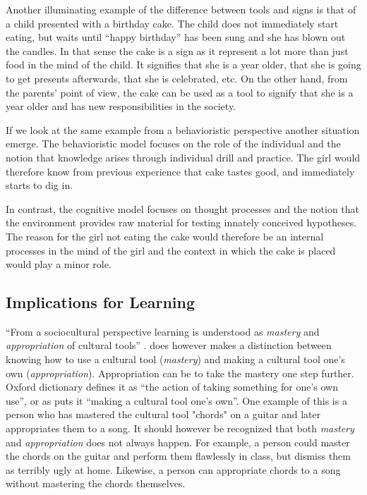 Another illuminating example of the difference between tools and signs is that of a child presented with a birthday cake. The child does not immediately start eating, but waits until “happy birthday” has been sung and she has blown out the candles. In that sense the cake is a sign as it represent a lot more than just food in the mind of the child. It signifies that she is a year older, that she is going to get presents afterwards, that she is celebrated, etc. On the other hand, from the parents’ point of view, the cake can be used as a tool to signify that she is a year older and has new responsibilities in the society. 

If we look at the same example from a behavioristic perspective another situation emerge. The behavioristic model focuses on the role of the individual and the notion that knowledge arises through individual drill and practice. The girl would therefore know from previous experience that cake tastes good, and immediately starts to dig in. 

In contrast, the cognitive model focuses on thought processes and the notion that the environment provides raw material for testing innately conceived hypotheses. The reason for the girl not eating the cake would therefore be an internal processes in the mind of the girl and the context in which the cake is placed would play a minor role. 

\subsection{Implications for Learning}
“From a sociocultural perspective learning is understood as \emph{mastery} and \emph{appropriation} of cultural tools” \citetext{Wertsch, 1998, Säljö, 1999, 2001, cited in \citealp{mifsud2010reconsidering}}. \citet{wertsch1998mind} does however makes a distinction between knowing how to use a cultural tool (\emph{mastery}) and making a cultural tool one’s own (\emph{appropriation}). Appropriation can be to take the mastery one step further. Oxford dictionary defines it as “the action of taking something for one’s own use”, or as \citeauthor{wertsch1998mind} puts it “making a cultural tool one’s own”. One example of this is a person who has mastered the cultural tool "chords" on a guitar and later appropriates them to a song. It should however be recognized that both \emph{mastery} and \emph{appropriation} does not always happen. For example, a person could master the chords on the guitar and perform them flawlessly in class, but dismiss them as terribly ugly at home. Likewise, a person can appropriate chords to a song without mastering the chords themselves.

